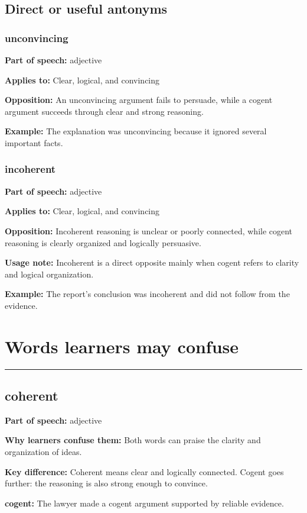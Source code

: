 \documentclass[11pt]{article}
\newcommand{\sectionrule}{\par\vspace{-0.5em}\noindent\textcolor{Accent}{\rule{\linewidth}{0.6pt}}\par}
\begin{document}
\subsection{Direct or useful antonyms}
\subsubsection{unconvincing}
\textbf{Part of speech:} adjective

\textbf{Applies to:} Clear, logical, and convincing

\textbf{Opposition:} An unconvincing argument fails to persuade, while a cogent argument succeeds through clear and strong reasoning.

\textbf{Example:} The explanation was unconvincing because it ignored several important facts.

\subsubsection{incoherent}
\textbf{Part of speech:} adjective

\textbf{Applies to:} Clear, logical, and convincing

\textbf{Opposition:} Incoherent reasoning is unclear or poorly connected, while cogent reasoning is clearly organized and logically persuasive.

\textbf{Usage note:} Incoherent is a direct opposite mainly when cogent refers to clarity and logical organization.

\textbf{Example:} The report's conclusion was incoherent and did not follow from the evidence.

\section{Words learners may confuse}
\sectionrule
\subsection{coherent}
\textbf{Part of speech:} adjective

\textbf{Why learners confuse them:} Both words can praise the clarity and organization of ideas.

\textbf{Key difference:} Coherent means clear and logically connected. Cogent goes further: the reasoning is also strong enough to convince.

\textbf{cogent:} The lawyer made a cogent argument supported by reliable evidence.
\end{document}

